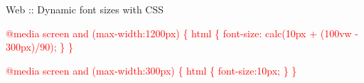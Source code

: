 \documentclass[8pt,xcolor={svgnames, x11names}]{beamer}
\begin{document}
\begin{frame}{Web :: Dynamic font sizes with CSS}
\begin{textblock*}{1\textwidth}
{\begin{enumerate}
{					\textcolor{red}{\ttfamily @media screen and (max-width:1200px) \{ \newline
						html \{ font-size: calc(10px + (100vw - 300px)/90); \} \newline \} } \pars

					\textcolor{red}{\ttfamily @media screen and (max-width:300px) \{ \newline
						html \{ font-size:10px; \} \newline\} } 
				}					 			
			\end{enumerate}			
		}

	\end{textblock*}

	

	


		

	
\end{frame}
\end{document}

